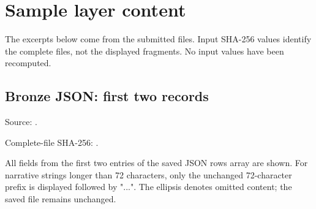 \appendix

\section{Sample layer content}

The excerpts below come from the submitted files. Input SHA-256 values identify the complete files, not the displayed fragments. No input values have been recomputed.

\subsection{Bronze JSON: first two records}

Source: .

Complete-file SHA-256: .

All fields from the first two entries of the saved JSON rows array are shown. For narrative strings longer than 72 characters, only the unchanged 72-character prefix is displayed followed by "...". The ellipsis denotes omitted content; the saved file remains unchanged.

